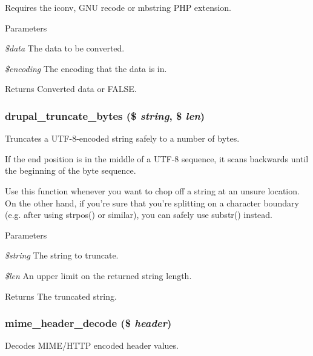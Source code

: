 Requires the iconv, GNU recode or mbstring PHP extension.


\begin{DoxyParams}{Parameters}
\item[{\em \$data}]The data to be converted. \item[{\em \$encoding}]The encoding that the data is in.\end{DoxyParams}
\begin{DoxyReturn}{Returns}
Converted data or FALSE. 
\end{DoxyReturn}
\hypertarget{unicode_8inc_a5642d9adcf8fc48af1894523b9c52e96}{
\subsubsection[{drupal\_\-truncate\_\-bytes}]{\setlength{\rightskip}{0pt plus 5cm}drupal\_\-truncate\_\-bytes (\$ {\em string}, \/  \$ {\em len})}}
\label{unicode_8inc_a5642d9adcf8fc48af1894523b9c52e96}
Truncates a UTF-\/8-\/encoded string safely to a number of bytes.

If the end position is in the middle of a UTF-\/8 sequence, it scans backwards until the beginning of the byte sequence.

Use this function whenever you want to chop off a string at an unsure location. On the other hand, if you're sure that you're splitting on a character boundary (e.g. after using strpos() or similar), you can safely use substr() instead.


\begin{DoxyParams}{Parameters}
\item[{\em \$string}]The string to truncate. \item[{\em \$len}]An upper limit on the returned string length.\end{DoxyParams}
\begin{DoxyReturn}{Returns}
The truncated string. 
\end{DoxyReturn}
\hypertarget{unicode_8inc_ab925f3117ef3c0d5736c4c38d0346aa3}{
\subsubsection[{mime\_\-header\_\-decode}]{\setlength{\rightskip}{0pt plus 5cm}mime\_\-header\_\-decode (\$ {\em header})}}
\label{unicode_8inc_ab925f3117ef3c0d5736c4c38d0346aa3}
Decodes MIME/HTTP encoded header values.


